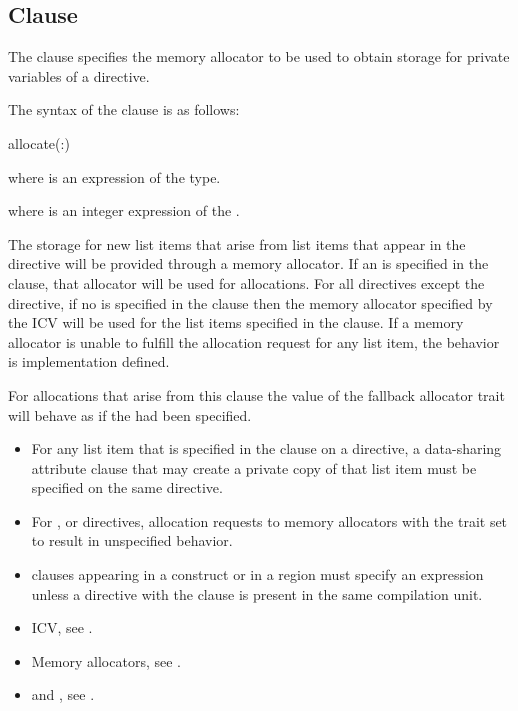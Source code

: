 \subsection{ Clause}
\label{subsec:allocate Clause}
\summary
The  clause specifies the memory allocator to be used to obtain storage for private variables of a directive.

\syntax

The syntax of the  clause is as follows:

\begin{ompSyntax}
allocate(\plc{[allocator}:\plc{] list})
\end{ompSyntax}

\begin{ccppspecific}
where  is an expression of the  type.
\end{ccppspecific}
\begin{fortranspecific}
where  is an integer expression of the  .
\end{fortranspecific}

\descr

The storage for new list items that arise from list items that appear in the directive will be provided through a memory allocator. If an  is specified in the clause, that allocator will be used for allocations. For all directives except the  directive, if no  is specified in the clause then the memory allocator specified by the  ICV will be used for the list items specified in the  clause. If a memory allocator is unable to fulfill the allocation request for any list item, the behavior is implementation defined.

For allocations that arise from this clause the  value of the fallback allocator trait will behave as if the  had been specified.

\restrictions
\begin{itemize}
\item For any list item that is specified in the  clause on a directive, a data-sharing attribute clause that may create a private copy of that list item must be specified on the same directive.
\item For ,  or  directives, allocation requests to memory allocators with the trait  set to  result in unspecified behavior.
\item {} clauses appearing in a  construct or in a  region must specify an  expression unless a  directive with the  clause is present in the same compilation unit.
\end{itemize}

\crossreferences
\begin{itemize}
\item {} ICV, see .
\item Memory allocators, see .
\item {} and , see .
\end{itemize}

